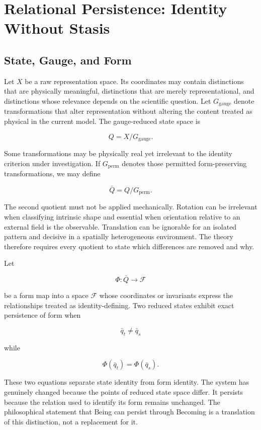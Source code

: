 \chapter{Relational Persistence: Identity Without Stasis}

\section{State, Gauge, and Form}

Let $X$ be a raw representation space. Its coordinates may contain distinctions that are physically meaningful, distinctions that are merely representational, and distinctions whose relevance depends on the scientific question. Let $G_{\mathrm{gauge}}$ denote transformations that alter representation without altering the content treated as physical in the current model. The gauge-reduced state space is

\[
Q = X/G_{\mathrm{gauge}}.
\]

Some transformations may be physically real yet irrelevant to the identity criterion under investigation. If $G_{\mathrm{perm}}$ denotes those permitted form-preserving transformations, we may define

\[
\bar Q = Q/G_{\mathrm{perm}}.
\]

The second quotient must not be applied mechanically. Rotation can be irrelevant when classifying intrinsic shape and essential when orientation relative to an external field is the observable. Translation can be ignorable for an isolated pattern and decisive in a spatially heterogeneous environment. The theory therefore requires every quotient to state which differences are removed and why.

Let

\[
\Phi : \bar Q \longrightarrow \mathcal{F}
\]

be a form map into a space $\mathcal{F}$ whose coordinates or invariants express the relationships treated as identity-defining. Two reduced states exhibit exact persistence of form when

\[
\bar q_t \neq \bar q_s
\]

while

\[
\Phi(\bar q_t)=\Phi(\bar q_s).
\]

These two equations separate state identity from form identity. The system has genuinely changed because the points of reduced state space differ. It persists because the relation used to identify its form remains unchanged. The philosophical statement that Being can persist through Becoming is a translation of this distinction, not a replacement for it.

